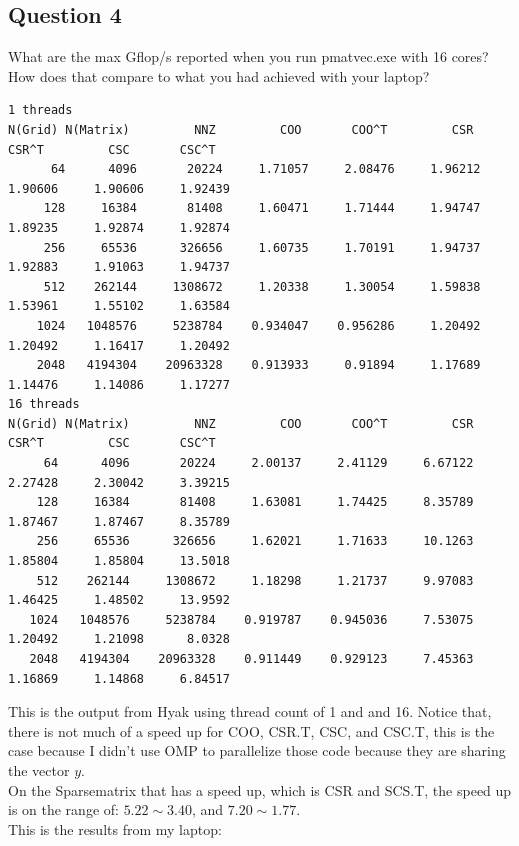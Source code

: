 \documentclass[]{article}
\begin{document}
    \subsection*{Question 4}
    What are the max Gflop/s reported when you run pmatvec.exe with 16 cores? How does that compare to what you had achieved with your laptop?
    \begin{lstlisting}
1 threads   
N(Grid) N(Matrix)         NNZ         COO       COO^T         CSR       CSR^T         CSC       CSC^T
      64      4096       20224     1.71057     2.08476     1.96212     1.90606     1.90606     1.92439
     128     16384       81408     1.60471     1.71444     1.94747     1.89235     1.92874     1.92874
     256     65536      326656     1.60735     1.70191     1.94737     1.92883     1.91063     1.94737
     512    262144     1308672     1.20338     1.30054     1.59838     1.53961     1.55102     1.63584
    1024   1048576     5238784    0.934047    0.956286     1.20492     1.20492     1.16417     1.20492
    2048   4194304    20963328    0.913933     0.91894     1.17689     1.14476     1.14086     1.17277
16 threads  
N(Grid) N(Matrix)         NNZ         COO       COO^T         CSR       CSR^T         CSC       CSC^T
     64      4096       20224     2.00137     2.41129     6.67122     2.27428     2.30042     3.39215
    128     16384       81408     1.63081     1.74425     8.35789     1.87467     1.87467     8.35789
    256     65536      326656     1.62021     1.71633     10.1263     1.85804     1.85804     13.5018
    512    262144     1308672     1.18298     1.21737     9.97083     1.46425     1.48502     13.9592
   1024   1048576     5238784    0.919787    0.945036     7.53075     1.20492     1.21098      8.0328
   2048   4194304    20963328    0.911449    0.929123     7.45363     1.16869     1.14868     6.84517   
    \end{lstlisting}
    This is the output from Hyak using thread count of 1 and and 16. Notice that, there is not much of a speed up for COO, CSR.T, CSC, and CSC.T, this is the case because I didn't use OMP to parallelize those code because they are sharing the vector $y$. 
    \\
    On the Sparsematrix that has a speed up, which is CSR and SCS.T, the speed up is on the range of: $5.22 \sim 3.40$, and $7.20 \sim 1.77$. 
    \\
    This is the results from my laptop: 
\end{document}
